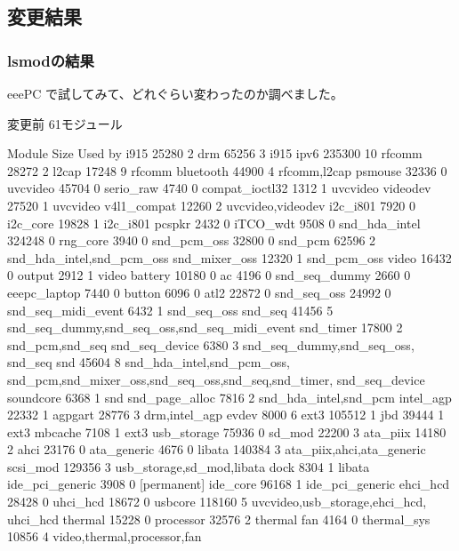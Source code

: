 \documentclass[mingoth,a4paper]{jsarticle}
\begin{document}
\subsection{変更結果}

\subsubsection{lsmodの結果}

eeePC で試してみて、どれぐらい変わったのか調べました。
\begin{multicols}{2}
 変更前 61モジュール
\begin{commandline}
Module                  Size  Used by
i915                   25280  2   
drm                    65256  3 i915
ipv6                  235300  10  
rfcomm                 28272  2   
l2cap                  17248  9 rfcomm
bluetooth              44900  4 rfcomm,l2cap
psmouse                32336  0   
uvcvideo               45704  0   
serio_raw               4740  0   
compat_ioctl32          1312  1 uvcvideo
videodev               27520  1 uvcvideo
v4l1_compat            12260  2 uvcvideo,videodev
i2c_i801                7920  0   
i2c_core               19828  1 i2c_i801
pcspkr                  2432  0   
iTCO_wdt                9508  0   
snd_hda_intel         324248  0   
rng_core                3940  0   
snd_pcm_oss            32800  0   
snd_pcm                62596  2 snd_hda_intel,snd_pcm_oss
snd_mixer_oss          12320  1 snd_pcm_oss
video                  16432  0   
output                  2912  1 video
battery                10180  0   
ac                      4196  0   
snd_seq_dummy           2660  0   
eeepc_laptop            7440  0   
button                  6096  0   
atl2                   22872  0   
snd_seq_oss            24992  0   
snd_seq_midi_event      6432  1 snd_seq_oss
snd_seq                41456  5
 snd_seq_dummy,snd_seq_oss,snd_seq_midi_event 
snd_timer              17800  2 snd_pcm,snd_seq
snd_seq_device          6380  3 snd_seq_dummy,snd_seq_oss,
snd_seq 
snd                    45604  8 snd_hda_intel,snd_pcm_oss,
snd_pcm,snd_mixer_oss,snd_seq_oss,snd_seq,snd_timer,
snd_seq_device
soundcore               6368  1 snd 
snd_page_alloc          7816  2 snd_hda_intel,snd_pcm
intel_agp              22332  1   
agpgart                28776  3 drm,intel_agp
evdev                   8000  6   
ext3                  105512  1   
jbd                    39444  1 ext3
mbcache                 7108  1 ext3
usb_storage            75936  0
sd_mod                 22200  3
ata_piix               14180  2
ahci                   23176  0
ata_generic             4676  0
libata                140384  3 ata_piix,ahci,ata_generic
scsi_mod              129356  3 usb_storage,sd_mod,libata
dock                    8304  1 libata
ide_pci_generic         3908  0 [permanent]
ide_core               96168  1 ide_pci_generic
ehci_hcd               28428  0
uhci_hcd               18672  0
usbcore               118160  5 uvcvideo,usb_storage,ehci_hcd,
uhci_hcd
thermal                15228  0
processor              32576  2 thermal
fan                     4164  0
thermal_sys            10856  4 video,thermal,processor,fan
\end{commandline}


\end{multicols}
\end{document}
